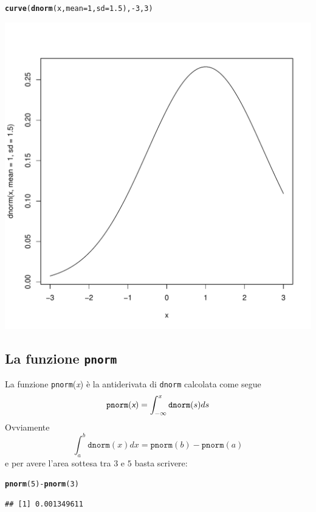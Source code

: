 \documentclass[onecolumn,12pt]{book}\usepackage[]{graphicx}\usepackage[]{color}
\makeatletter
\def\maxwidth{ %
  \ifdim\Gin@nat@width>\linewidth
    \linewidth
  \else
    \Gin@nat@width
  \fi
}
\newcommand{\hlnum}[1]{\textcolor[rgb]{0.686,0.059,0.569}{#1}}%
\newcommand{\hlopt}[1]{\textcolor[rgb]{0,0,0}{#1}}%
\newcommand{\hlstd}[1]{\textcolor[rgb]{0.345,0.345,0.345}{#1}}%
\newcommand{\hlkwc}[1]{\textcolor[rgb]{0.333,0.667,0.333}{#1}}%
\newcommand{\hlkwd}[1]{\textcolor[rgb]{0.737,0.353,0.396}{\textbf{#1}}}%
\newenvironment{kframe}{%
 \def\at@end@of@kframe{}%
 \ifinner\ifhmode%
  \def\at@end@of@kframe{\end{minipage}}%
  \begin{minipage}{\columnwidth}%
 \fi\fi%
 \def\FrameCommand##1{\hskip\@totalleftmargin \hskip-\fboxsep
 \colorbox{shadecolor}{##1}\hskip-\fboxsep
     \hskip-\linewidth \hskip-\@totalleftmargin \hskip\columnwidth}%
 \MakeFramed {\advance\hsize-\width
   \@totalleftmargin\z@ \linewidth\hsize
   \@setminipage}}%
 {\par\unskip\endMakeFramed%
 \at@end@of@kframe}
\newenvironment{knitrout}{}{} %
\newcommand{\varia}[1]{\textsl{\textsf{#1}}}
\makeatother
\begin{document}
\begin{knitrout}
\color{fgcolor}\begin{kframe}
\begin{alltt}
\hlkwd{curve}\hlstd{(}\hlkwd{dnorm}\hlstd{(x,}\hlkwc{mean}\hlstd{=}\hlnum{1}\hlstd{,}\hlkwc{sd}\hlstd{=}\hlnum{1.5}\hlstd{),}\hlopt{-}\hlnum{3}\hlstd{,}\hlnum{3}\hlstd{)}
\end{alltt}
\end{kframe}
\includegraphics[width=\maxwidth]{figure/unnamed-chunk-140-1} 

\end{knitrout}
\subsection{La funzione \texttt{pnorm}}
La funzione \texttt{pnorm}(\varia{x})   \`e la antiderivata di \texttt{dnorm} calcolata come segue
\begin{equation*}\texttt{pnorm}(\varia{x}) =\int_{-\infty}^x  \texttt{dnorm}(s)ds
\end{equation*}
Ovviamente
$$\int_a^b \texttt{dnorm}(x)dx=\texttt{pnorm}(b)-\texttt{pnorm}(a)$$
e per avere l'area sottesa tra $3$ e $5$  basta scrivere:
\begin{knitrout}
\color{fgcolor}\begin{kframe}
\begin{alltt}
\hlkwd{pnorm}\hlstd{(}\hlnum{5}\hlstd{)}\hlopt{-}\hlkwd{pnorm}\hlstd{(}\hlnum{3}\hlstd{)}
\end{alltt}
\begin{verbatim}
## [1] 0.001349611
\end{verbatim}
\end{kframe}
\end{knitrout}
\end{document}
